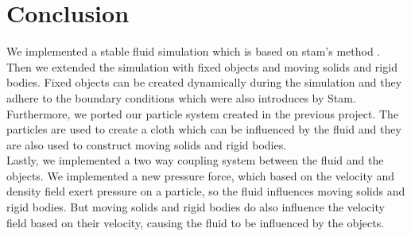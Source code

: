 \section{Conclusion}
We implemented a stable fluid simulation which is based on stam's method \cite{stable}. Then we extended the simulation with fixed objects and moving solids and rigid bodies. Fixed objects can be created dynamically during the simulation and they adhere to the boundary conditions which were also introduces by Stam. Furthermore, we ported our particle system created in the previous project. The particles are used to create a cloth which can be influenced by the fluid and they are also used to construct moving solids and rigid bodies.\\
Lastly, we implemented a two way coupling system between the fluid and the objects. We implemented a new pressure force, which based on the velocity and density field exert pressure on a particle, so the fluid influences moving solids and rigid bodies. But moving solids and rigid bodies do also influence the velocity field based on their velocity, causing the fluid to be influenced by the objects. 
